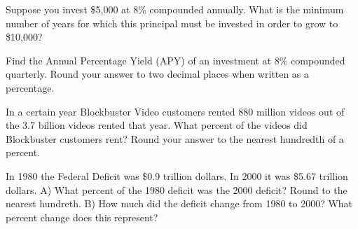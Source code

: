 \documentclass[11pt,epsfig]{article}
\begin{document}
\newpage

\begin{problem}{12}
Suppose you invest \$5,000 at 8\% compounded annually. What is the minimum number of years for which this principal must be invested in order to grow to \$10,000?
\vfill
\end{problem}

\begin{problem}{12}
Find the Annual Percentage Yield (APY) of an investment at 8\% compounded quarterly. Round your answer to two decimal places when written as a percentage.
\vfill
\end{problem}

\newpage

\begin{problem}{12}
In a certain year Blockbuster Video customers rented 880 million videos out of the 3.7 billion videos rented that year. What percent of the videos did Blockbuster customers rent? Round your answer to the nearest hundredth of a percent.
\vfill
\end{problem}

\begin{problem}{15}
In 1980 the Federal Deficit was \$0.9 trillion dollars. In 2000 it was \$5.67 trillion dollars.
\newline
A) What percent of the 1980 deficit was the 2000 deficit? Round to the nearest hundreth.
\newline
B) How much did the deficit change from 1980 to 2000? What percent change does this represent?

\vfill
\end{problem}

\showpoints
\end{document}
